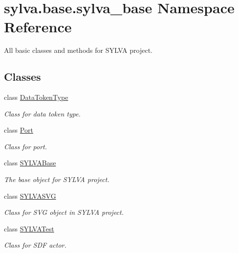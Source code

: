 \hypertarget{namespacesylva_1_1base_1_1sylva__base}{}\section{sylva.\+base.\+sylva\+\_\+base Namespace Reference}
\label{namespacesylva_1_1base_1_1sylva__base}


All basic classes and methods for S\+Y\+L\+VA project.  


\subsection*{Classes}
\begin{DoxyCompactItemize}
\item 
class \hyperlink{classsylva_1_1base_1_1sylva__base_1_1_data_token_type}{Data\+Token\+Type}
\begin{DoxyCompactList}\small\item\em Class for data token type. \end{DoxyCompactList}\item 
class \hyperlink{classsylva_1_1base_1_1sylva__base_1_1_port}{Port}
\begin{DoxyCompactList}\small\item\em Class for port. \end{DoxyCompactList}\item 
class \hyperlink{classsylva_1_1base_1_1sylva__base_1_1_s_y_l_v_a_base}{S\+Y\+L\+V\+A\+Base}
\begin{DoxyCompactList}\small\item\em The base object for S\+Y\+L\+VA project. \end{DoxyCompactList}\item 
class \hyperlink{classsylva_1_1base_1_1sylva__base_1_1_s_y_l_v_a_s_v_g}{S\+Y\+L\+V\+A\+S\+VG}
\begin{DoxyCompactList}\small\item\em Class for S\+VG object in S\+Y\+L\+VA project. \end{DoxyCompactList}\item 
class \hyperlink{classsylva_1_1base_1_1sylva__base_1_1_s_y_l_v_a_test}{S\+Y\+L\+V\+A\+Test}
\begin{DoxyCompactList}\small\item\em Class for S\+DF actor. \end{DoxyCompactList}\end{DoxyCompactItemize}
